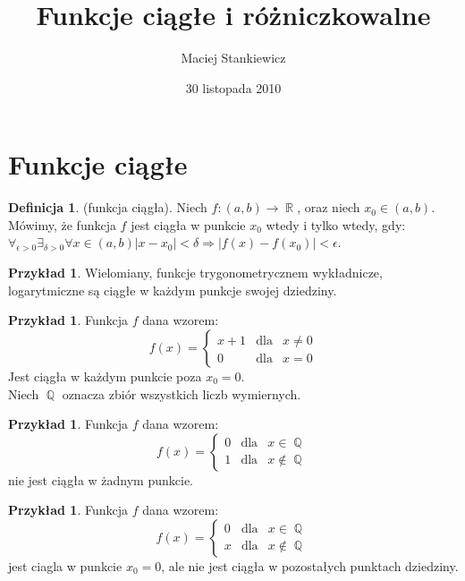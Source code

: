 \documentclass[12pt,a4paper]{article}
\title{Funkcje ciągłe i różniczkowalne}
\author{Maciej Stankiewicz}
\date{30 listopada 2010}
\theoremstyle{definition}
\newtheorem{df}[tw]{Definicja}
\newtheorem{ex}[tw]{Przykład}
\DeclareMathOperator{\R}{\mathbb{R}}
\DeclareMathOperator{\Q}{\mathbb{Q}}
\begin{document}
\maketitle
\tableofcontents


\section{Funkcje ciągłe}
	\begin{df}
		(funkcja ciągła). Niech $f : (a,b) \rightarrow \R$, oraz niech $x_0 \in (a,b)$. %
		Mówimy, że funkcja $f$ jest ciągła w punkcie $x_0$ wtedy i tylko wtedy, gdy:\\

	$\forall_{\epsilon > 0} \exists_{ \delta > 0} \forall x \in (a,b) |x - x_0| < \delta \Rightarrow |f(x) - f(x_0)| < \epsilon$.
	\end{df}
	\begin{ex}
		Wielomiany, funkcje trygonometrycznem wykładnicze, logarytmiczne są ciągłe w każdym punkcje swojej dziedziny.
	\end{ex}
	\begin{ex}
		Funkcja $f$ dana wzorem:\\
	\begin{displaymath} 
		f(x)= \left\{\begin{array}{lll}
		x+1 & \textrm{dla} & x \neq 0 \\
		0 & \textrm{dla} & x=0
		\end{array} \right.
 	\end{displaymath}
		Jest ciągła w każdym punkcie poza $x_0 = 0$.\\
		Niech $\Q$ oznacza zbiór wszystkich liczb wymiernych.\\

	\end{ex}
	\begin{ex}
		Funkcja $f$ dana wzorem:\\
		\begin{displaymath} 
			f(x)= \left\{\begin{array}{lll}
			0 & \textrm{dla} & x \in \Q \\
			1 & \textrm{dla} & x \notin \Q
			\end{array} \right.
 		\end{displaymath}
		nie jest ciągła w żadnym punkcie.\\
	\end{ex}
	\begin{ex}
		Funkcja $f$ dana wzorem:\\
		\begin{displaymath} 
			f(x)= \left\{\begin{array}{lll}
			0 & \textrm{dla} & x \in \Q \\
			x & \textrm{dla} & x \notin \Q
			\end{array} \right.
 		\end{displaymath}
		jest ciagla w punkcie $x_0 = 0$, ale nie jest ciągła w pozostałych punktach dziedziny.\\
	\end{ex}
\end{document}
